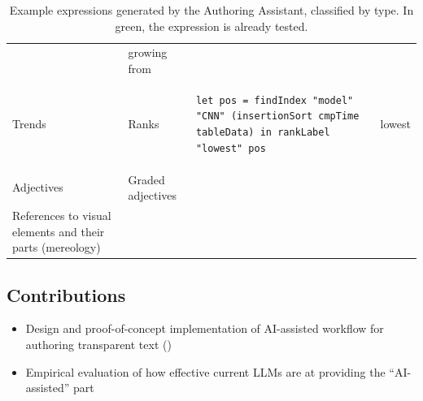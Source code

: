 \begin{table}[!ht]
\begin{tabular}{p{1.5cm}p{1.5cm}p{5cm}p{4cm}}
      & growing from \\
      \rowcolor{green!20}
      Trends & Ranks &
      \begin{lstlisting}[language=Fluid]
         let pos = findIndex "model" "CNN" (insertionSort cmpTime tableData) in rankLabel "lowest" pos
      \end{lstlisting}
      & lowest \\
      Adjectives & Graded adjectives  &  ~ & ~ \\
      References to visual elements and their parts (mereology) & ~ & ~ & ~ \\
      \bottomrule
   \end{tabular}
   \caption{Example expressions generated by the Authoring Assistant, classified by type. In green, the expression is already tested.}
   \label{tab:fluid_examples}
   \renewcommand{\arraystretch}{1.0}
\end{table}

\subsection{Contributions}

\begin{itemize}
\item Design and proof-of-concept implementation of AI-assisted workflow for authoring transparent text
()
\item Empirical evaluation of how effective current LLMs are at providing the ``AI-assisted'' part
\end{itemize}
